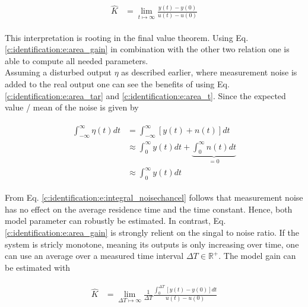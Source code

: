 \begin{align}
\begin{split}
\hat{K} &= \lim_{t\mapsto \infty} \frac{y(t)-y(0)}{u(t)-u(0)}
\end{split}
\label{c:identification:e:area_gain}
\end{align}

This interpretation is rooting in the final value theorem. Using Eq. \ref{c:identification:e:area_gain} in combination with the other two relation one is able to compute all needed parameters.\\

Assuming a disturbed output $\eta$ as described earlier, where measurement noise is added to the real output one can see the benefits of using Eq.\ref{c:identification:e:area_tar} and \ref{c:identification:e:area_t}. Since the expected value / mean of the noise is given by 

\begin{align}
\begin{split}
\int_{-\infty}^{\infty} \eta \left( t \right) dt&= \int_{-\infty}^{\infty} \left[ y \left(t \right) + n\left(t\right) \right] dt \\
&\approx \int_{0}^{\infty}  y \left(t \right) dt + \underbrace{\int_{0}^{\infty} n\left(t\right) dt }_{= 0}\\
&\approx \int_{0}^{\infty}  y \left(t \right) dt
\end{split}
\label{c:identification:e:integral_noisechancel}
\end{align}

From Eq. \ref{c:identification:e:integral_noisechancel} follows that measurement noise has no effect on the average residence time and the time constant. Hence, both model parameter can robustly be estimated. In contrast, Eq.\ref{c:identification:e:area_gain} is strongly relient on the singal to noise ratio. If the system is stricly monotone, meaning its outputs is only increasing over time, one can use an average over a measured time interval $\Delta T \in \mathbb{R}^+$. The model gain can be estimated with

\begin{align}
\begin{split}
\hat{K} &= \lim_{\Delta T\mapsto \infty} \frac{1}{\Delta T} \frac{\int_{0}^{\Delta T} \left[ y \left( t\right) - y\left(0\right)\right] dt}{u \left( t \right)-u \left( 0 \right)}
\end{split}
\label{c:identification:e:area_averagegain}
\end{align}


